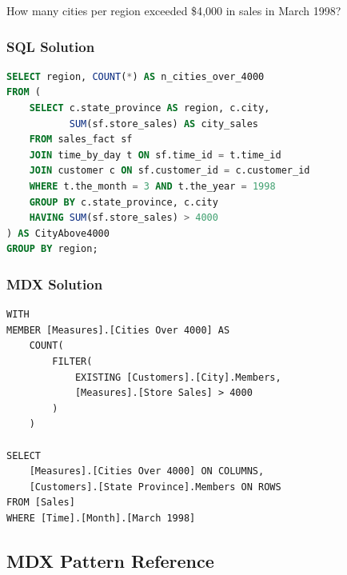 \begin{theorybox}[frametitle={Exercise}]
How many cities per region exceeded \$4{,}000 in sales in March 1998?
\end{theorybox}

\subsubsection*{SQL Solution}
\begin{lstlisting}[language=SQL]
SELECT region, COUNT(*) AS n_cities_over_4000
FROM (
    SELECT c.state_province AS region, c.city,
           SUM(sf.store_sales) AS city_sales
    FROM sales_fact sf
    JOIN time_by_day t ON sf.time_id = t.time_id
    JOIN customer c ON sf.customer_id = c.customer_id
    WHERE t.the_month = 3 AND t.the_year = 1998
    GROUP BY c.state_province, c.city
    HAVING SUM(sf.store_sales) > 4000
) AS CityAbove4000
GROUP BY region;
\end{lstlisting}

\subsubsection*{MDX Solution}
\begin{lstlisting}[language=MDX]
WITH
MEMBER [Measures].[Cities Over 4000] AS
    COUNT(
        FILTER(
            EXISTING [Customers].[City].Members,
            [Measures].[Store Sales] > 4000
        )
    )

SELECT
    [Measures].[Cities Over 4000] ON COLUMNS,
    [Customers].[State Province].Members ON ROWS
FROM [Sales]
WHERE [Time].[Month].[March 1998]
\end{lstlisting}

\subsection{MDX Pattern Reference}
\label{sec:mdx-patterns}
\label{mdx_patterns}

